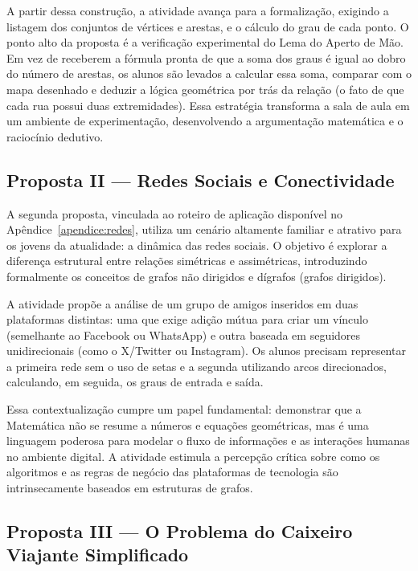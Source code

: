 \documentclass[
  12pt,
  oneside,
  a4paper,
  english,
  brazilian
  ]{abntex2}
\theoremstyle{definition}
\begin{document}
A partir dessa construção, a atividade avança para a formalização, exigindo a listagem dos conjuntos de vértices e arestas, e o cálculo do grau de cada ponto. O ponto alto da proposta é a verificação experimental do Lema do Aperto de Mão. Em vez de receberem a fórmula pronta de que a soma dos graus é igual ao dobro do número de arestas, os alunos são levados a calcular essa soma, comparar com o mapa desenhado e deduzir a lógica geométrica por trás da relação (o fato de que cada rua possui duas extremidades). Essa estratégia transforma a sala de aula em um ambiente de experimentação, desenvolvendo a argumentação matemática e o raciocínio dedutivo.

\subsection{Proposta II --- Redes Sociais e Conectividade}
\label{sub:proposta_redes}

A segunda proposta, vinculada ao roteiro de aplicação disponível no Apêndice~\ref{apendice:redes}, utiliza um cenário altamente familiar e atrativo para os jovens da atualidade: a dinâmica das redes sociais. O objetivo é explorar a diferença estrutural entre relações simétricas e assimétricas, introduzindo formalmente os conceitos de grafos não dirigidos e dígrafos (grafos dirigidos).

A atividade propõe a análise de um grupo de amigos inseridos em duas plataformas distintas: uma que exige adição mútua para criar um vínculo (semelhante ao Facebook ou WhatsApp) e outra baseada em seguidores unidirecionais (como o X/Twitter ou Instagram). Os alunos precisam representar a primeira rede sem o uso de setas e a segunda utilizando arcos direcionados, calculando, em seguida, os graus de entrada e saída.

Essa contextualização cumpre um papel fundamental: demonstrar que a Matemática não se resume a números e equações geométricas, mas é uma linguagem poderosa para modelar o fluxo de informações e as interações humanas no ambiente digital. A atividade estimula a percepção crítica sobre como os algoritmos e as regras de negócio das plataformas de tecnologia são intrinsecamente baseados em estruturas de grafos.

\subsection{Proposta III --- O Problema do Caixeiro Viajante Simplificado}
\label{sub:proposta_caixeiro} 
\end{document}
